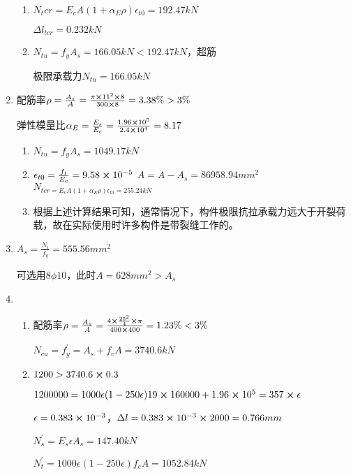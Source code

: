 \documentclass{article}
\begin{document}
\begin{questionList}
\begin{enumerate}
\begin{enumerate}
                        \item $N_tcr=E_cA(1+\alpha_E\rho)\epsilon_{t0}=192.47kN$
                              \par $\Delta l_{tcr}=0.232kN$
                        \item $N_{tu}=f_yA_s=166.05kN<192.47kN$，超筋
                              \par 极限承载力$N_{tu}=166.05kN$
                  \end{enumerate}
            \item 配筋率$\rho=\frac{A_s}{A}=\frac{\pi\cross 11^2\cross 8}{300\cross 8}=3.38\%>3\%$
                  \par 弹性模量比$\alpha_E=\frac{E_s}{E_c}=\frac{1.96\cross10^5}{2.4\cross 10^4}=8.17$
                  \begin{enumerate}
                        \item $N_{tu}=f_yA_s=1049.17kN$
                        \item $\epsilon_{t0}=\frac{f_t}{E_c}=9.58\cross10^{-5}$
                              $A=A-A_s=86958.94mm^2$
                              $N_{tcr=E_cA(1+\alpha_E\rho)\epsilon_{t0}=255.24kN}$
                        \item 根据上述计算结果可知，通常情况下，构件极限抗拉承载力远大于开裂荷载，故在实际使用时许多构件是带裂缝工作的。
                  \end{enumerate}
            \item $A_s=\frac{N_t}{f_y}=555.56mm^2$
                  \par 可选用$8\phi10$，此时$A=628mm^2>A_s$
            \item \begin{enumerate}
                        \item 配筋率$\rho=\frac{A_s}{A}=\frac{4\cross\frac{25^2}{4}\cross\pi}{400\cross400}=1.23\%<3\%$
                              \par $N_{cu}=f_y^{\prime}=A_s+f_cA=3740.6kN$
                        \item $1200>3740.6\cross0.3$
                              \par $1200000=1000\epsilon(1-250\epsilon)19\cross160000+1.96\cross10^5=357\cross\epsilon$
                              \par $\epsilon=0.383\cross10^{-3}$，$\Delta l=0.383\cross10^{-3}\cross2000=0.766mm$
                              \par $N_s^{\prime}=E_s\epsilon A_s=147.40kN$
                              \par $N_t^{\prime}=1000\epsilon(1-250\epsilon)f_cA=1052.84kN$

\end{enumerate}
\end{enumerate}
\end{questionList}
\end{document}
